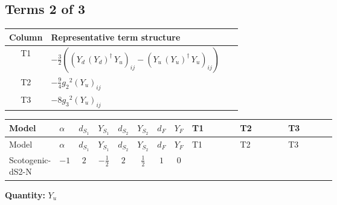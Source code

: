 \documentclass[8pt]{article}
\begin{document}
\begin{landscape}
\subsection*{Terms 2 of 3}
\begin{center}
\begin{tabular}{@{}c >{\raggedright\arraybackslash}p{0.82\linewidth}@{}}
\toprule
Column & Representative term structure \\
\midrule
T1 & \(\displaystyle -\frac{3}{2} (\left({Y_d}\,\left({Y_d}\right)^{\dagger}\,{Y_u}\right)_{ij}-\left({Y_u}\,\left({Y_u}\right)^{\dagger}\,{Y_u}\right)_{ij})\) \\
\midrule
T2 & \(\displaystyle -\frac{9}{4} {g_2}^2 \left({Y_u}\right)_{ij}\) \\
\midrule
T3 & \(\displaystyle -8 {g_3}^2 \left({Y_u}\right)_{ij}\) \\
\midrule
\bottomrule
\end{tabular}
\end{center}
\smallskip
\tiny
\begin{longtable}{@{}llcccccc >{\raggedright\arraybackslash}p{0.21\linewidth} >{\raggedright\arraybackslash}p{0.21\linewidth} >{\raggedright\arraybackslash}p{0.21\linewidth}@{}}
\toprule
Model & $\alpha$ & $d_{S_1}$ & $Y_{S_1}$ & $d_{S_2}$ & $Y_{S_2}$ & $d_F$ & $Y_F$ & T1 & T2 & T3 \\
\midrule
\endfirsthead
\toprule
Model & $\alpha$ & $d_{S_1}$ & $Y_{S_1}$ & $d_{S_2}$ & $Y_{S_2}$ & $d_F$ & $Y_F$ & T1 & T2 & T3 \\
\midrule
\endhead
Scotogenic-dS2-N & $-1$ & $2$ & $-\frac{1}{2}$ & $2$ & $\frac{1}{2}$ & $1$ & $0$ & \scriptsize\adjustbox{max width=\linewidth}{$\begin{gathered} -\frac{3}{2} (\left({Y_d}\,\left({Y_d}\right)^{\dagger}\,{Y_u}\right)_{ij}-\left({Y_u}\,\left({Y_u}\right)^{\dagger}\,{Y_u}\right)_{ij})\end{gathered}$} & \scriptsize\adjustbox{max width=\linewidth}{$\begin{gathered} -\frac{9}{4} {g_2}^2 \left({Y_u}\right)_{ij}\end{gathered}$} & \scriptsize\adjustbox{max width=\linewidth}{$\begin{gathered} -8 {g_3}^2 \left({Y_u}\right)_{ij}\end{gathered}$} \\
\midrule
\bottomrule
\end{longtable}
\clearpage
\noindent\textbf{Quantity: }$Y_u$\par\smallskip

\end{landscape}
\end{document}
